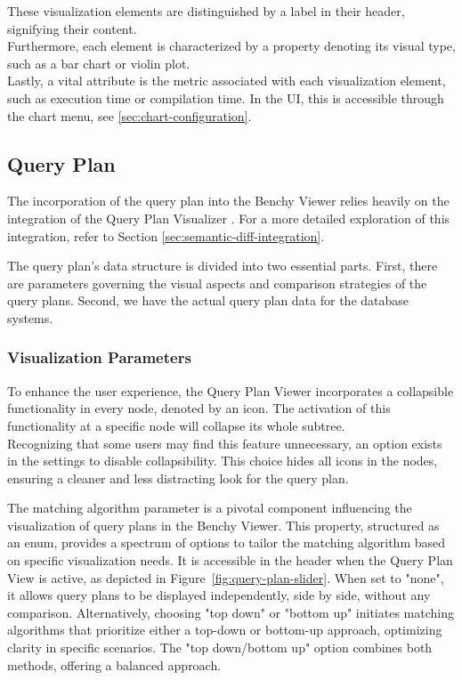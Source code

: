 These visualization elements are distinguished by a label in their header, signifying their content.\\
Furthermore, each element is characterized by a property denoting its visual type, such as a bar chart or violin plot.\\
Lastly, a vital attribute is the metric associated with each visualization element, such as execution time or compilation time. In the UI, this is accessible through the chart menu, see \ref{sec:chart-configuration}.





\subsection{Query Plan}
The incorporation of the query plan into the Benchy Viewer relies heavily on the integration of the Query Plan Visualizer \parencite{semantic-diff}. For a more detailed exploration of this integration, refer to Section \ref{sec:semantic-diff-integration}.

The query plan's data structure is divided into two essential parts. First, there are parameters governing the visual aspects and comparison strategies of the query plans. Second, we have the actual query plan data for the database systems.

\subsubsection{Visualization Parameters}\label{sec:query-plan-parameters}

To enhance the user experience, the Query Plan Viewer incorporates a collapsible functionality in every node, denoted by an icon. The activation of this functionality at a specific node will collapse its whole subtree.\\
Recognizing that some users may find this feature unnecessary, an option exists in the settings to disable collapsibility. This choice hides all icons in the nodes, ensuring a cleaner and less distracting look for the query plan.

The matching algorithm parameter is a pivotal component influencing the visualization of query plans in the Benchy Viewer. This property, structured as an enum, provides a spectrum of options to tailor the matching algorithm based on specific visualization needs. It is accessible in the header when the Query Plan View is active, as depicted in Figure~\ref{fig:query-plan-slider}. When set to "none", it allows query plans to be displayed independently, side by side, without any comparison. Alternatively, choosing "top down" or "bottom up" initiates matching algorithms that prioritize either a top-down or bottom-up approach, optimizing clarity in specific scenarios. The "top down/bottom up" option combines both methods, offering a balanced approach.

